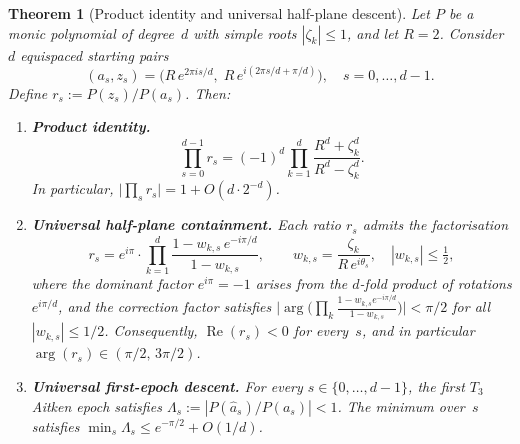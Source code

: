 \documentclass[10pt,a4paper,oneside]{book}
\newtheorem{theorem}{Theorem}[chapter]
\theoremstyle{definition}
\theoremstyle{remark}
\begin{document}
\begin{theorem}[Product identity and universal half-plane descent]
\label{thm:winding}
Let $P$ be a monic polynomial of degree~$d$ with simple roots $|\zeta_k| \leq 1$, and let $R = 2$.  Consider $d$ equispaced starting pairs
\[
  (a_s, z_s) = \bigl(R\,e^{2\pi i s/d},\; R\,e^{i(2\pi s/d + \pi/d)}\bigr), \quad s = 0,\ldots,d-1.
\]
Define $r_s := P(z_s)/P(a_s)$.  Then:
\begin{enumerate}
\item[\textup{(i)}] \textbf{Product identity.}
\[
  \prod_{s=0}^{d-1} r_s = (-1)^d \prod_{k=1}^d \frac{R^d + \zeta_k^d}{R^d - \zeta_k^d}.
\]
In particular, $\bigl|\prod_s r_s\bigr| = 1 + O(d\cdot 2^{-d})$.
\item[\textup{(ii)}] \textbf{Universal half-plane containment.}  Each ratio $r_s$ admits the factorisation
\[
  r_s = e^{i\pi} \cdot \prod_{k=1}^d \frac{1 - w_{k,s}\,e^{-i\pi/d}}{1 - w_{k,s}}, \qquad w_{k,s} = \frac{\zeta_k}{R\,e^{i\theta_s}},\quad |w_{k,s}| \leq \tfrac{1}{2},
\]
where the dominant factor $e^{i\pi} = -1$ arises from the $d$-fold product of rotations $e^{i\pi/d}$, and the correction factor satisfies $\bigl|\arg\bigl(\prod_k \tfrac{1-w_{k,s}e^{-i\pi/d}}{1-w_{k,s}}\bigr)\bigr| < \pi/2$ for all $|w_{k,s}| \leq 1/2$. Consequently, $\operatorname{Re}(r_s) < 0$ for \emph{every}~$s$, and in particular $\arg(r_s) \in (\pi/2,\, 3\pi/2)$.

\item[\textup{(iii)}] \textbf{Universal first-epoch descent.}  For every $s \in \{0,\ldots,d-1\}$, the first $T_3$ Aitken epoch satisfies $\Lambda_s := |P(\hat{a}_s)/P(a_s)| < 1$.  The minimum over~$s$ satisfies $\min_s \Lambda_s \leq e^{-\pi/2} + O(1/d)$.
\end{enumerate}
\end{theorem}
\end{document}
